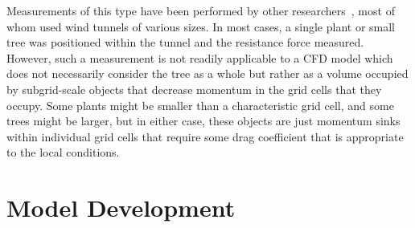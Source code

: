 \documentclass[12pt]{article}
\begin{document}
Measurements of this type have been performed by other researchers~\cite{Cao2012,Jalonen2014,Mayhead1973,Gillies2002,Ishikawa2006}, most of whom used wind tunnels of various sizes. In most cases, a single plant or small tree was positioned within the tunnel and the resistance force measured. However, such a measurement is not readily applicable to a CFD model which does not necessarily consider the tree as a whole but rather as a volume occupied by subgrid-scale objects that decrease momentum in the grid cells that they occupy. Some plants might be smaller than a characteristic grid cell, and some trees might be larger, but in either case, these objects are just momentum sinks within individual grid cells that require some drag coefficient that is appropriate to the local conditions.


\section{Model Development}
\label{ssec:headingscap}
\end{document}
